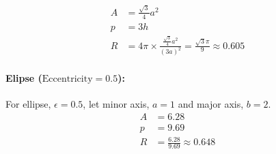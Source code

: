 \begin{align}
	A &= \frac{\sqrt{3}}{4}a^2 \\
	p &= 3h \\
	R &= 4\pi \times \frac{\frac{\sqrt{3}}{4}a^2}{{(3a)}^2} = \frac{\sqrt{3}\pi}{9} \approx 0.605
\end{align}

\paragraph{Elipse ($\textrm{Eccentricity} = 0.5$):}
\label{par:elipse}

For ellipse, $\epsilon = 0.5$, let minor axis, $a = 1$ and major axis, $b = 2$.
\begin{align}
	A &= 6.28 \\
	p &= 9.69 \\
	R &= \frac{6.28}{9.69} \approx 0.648
\end{align}
